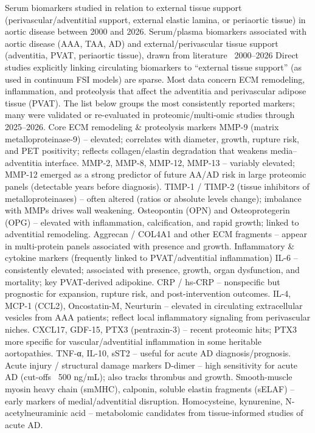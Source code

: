 Serum biomarkers studied in relation to external tissue support (perivascular/adventitial support, external elastic lamina, or periaortic tissue) in aortic disease between 2000 and 2026.
Serum/plasma biomarkers associated with aortic disease (AAA, TAA, AD) and external/perivascular tissue support (adventitia, PVAT, periaortic tissue), drawn from literature ~2000–2026
Direct studies explicitly linking circulating biomarkers to “external tissue support” (as used in continuum FSI models) are sparse. Most data concern ECM remodeling, inflammation, and proteolysis that affect the adventitia and perivascular adipose tissue (PVAT). The list below groups the most consistently reported markers; many were validated or re-evaluated in proteomic/multi-omic studies through 2025–2026.
Core ECM remodeling & proteolysis markers
MMP-9 (matrix metalloproteinase-9) – elevated; correlates with diameter, growth, rupture risk, and PET positivity; reflects collagen/elastin degradation that weakens media–adventitia interface.
MMP-2, MMP-8, MMP-12, MMP-13 – variably elevated; MMP-12 emerged as a strong predictor of future AA/AD risk in large proteomic panels (detectable years before diagnosis).
TIMP-1 / TIMP-2 (tissue inhibitors of metalloproteinases) – often altered (ratios or absolute levels change); imbalance with MMPs drives wall weakening.
Osteopontin (OPN) and Osteoprotegerin (OPG) – elevated with inflammation, calcification, and rapid growth; linked to adventitial remodeling.
Aggrecan / COL4A1 and other ECM fragments – appear in multi-protein panels associated with presence and growth.
Inflammatory & cytokine markers (frequently linked to PVAT/adventitial inflammation)
IL-6 – consistently elevated; associated with presence, growth, organ dysfunction, and mortality; key PVAT-derived adipokine.
CRP / hs-CRP – nonspecific but prognostic for expansion, rupture risk, and post-intervention outcomes.
IL-4, MCP-1 (CCL2), Oncostatin-M, Neurturin – elevated in circulating extracellular vesicles from AAA patients; reflect local inflammatory signaling from perivascular niches.
CXCL17, GDF-15, PTX3 (pentraxin-3) – recent proteomic hits; PTX3 more specific for vascular/adventitial inflammation in some heritable aortopathies.
TNF-α, IL-10, sST2 – useful for acute AD diagnosis/prognosis.
Acute injury / structural damage markers
D-dimer – high sensitivity for acute AD (cut-offs ~500 ng/mL); also tracks thrombus and growth.
Smooth-muscle myosin heavy chain (smMHC), calponin, soluble elastin fragments (sELAF) – early markers of medial/adventitial disruption.
Homocysteine, kynurenine, N-acetylneuraminic acid – metabolomic candidates from tissue-informed studies of acute AD.
